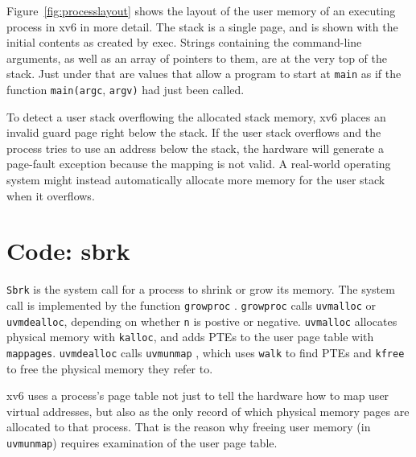 Figure~\ref{fig:processlayout} shows the layout of the user memory of
an executing process in xv6 in more detail.  The stack is a single
page, and is shown with the initial contents as created by exec.
Strings containing the command-line arguments, as well as an array of
pointers to them, are at the very top of the stack.  Just under that
are values that allow a program to start at \lstinline{main} as if the
function \lstinline{main(argc}, \lstinline{argv)} had just
been called.

To detect a user stack overflowing the allocated stack memory, xv6
places an invalid guard page right below the stack. If the user stack
overflows and the process tries to use an address below the stack, the
hardware will generate a page-fault exception because the mapping is
not valid. A real-world operating system might instead automatically
allocate more memory for the user stack when it overflows.

\section{Code: sbrk}

\lstinline{Sbrk}
is the system call for a process to shrink or grow its memory. The system
call is implemented by the function
\lstinline{growproc}
.
\lstinline{growproc} calls \lstinline{uvmalloc} or
\lstinline{uvmdealloc}, depending on whether \lstinline{n} is postive
or negative.
\lstinline{uvmalloc}
allocates physical memory with {\tt kalloc},
and adds PTEs to the user page table with {\tt mappages}.
\lstinline{uvmdealloc} calls
{\tt uvmunmap}
,
which uses {\tt walk} to find PTEs and
{\tt kfree} to free the physical memory they refer to.

xv6 uses a process's page table not just to tell the hardware how to
map user virtual addresses, but also as the only record of which
physical memory pages are allocated to that process. That is the
reason why freeing user memory (in {\tt uvmunmap}) requires
examination of the user page table.

